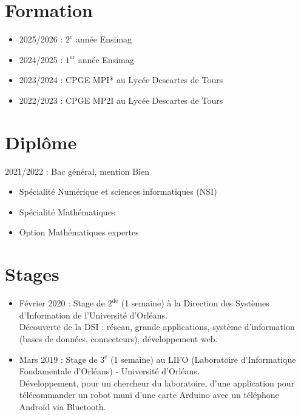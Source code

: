 \documentclass[11pt,oneside,a4paper,titlepage]{article}
\begin{document}
\begin{tcolorbox}
\begin{minipage}[t]{10.6cm}
\begin{tcolorbox}[grow to right by=0.75cm,colframe=white,colback=white]
      \section*{Formation}
      \begin{itemize}
        \item{2025/2026 : $2^e$ année Ensimag}
        \item{2024/2025 : $1^{\text{er}}$ année Ensimag}
        \item{2023/2024 : CPGE MPI* au Lycée Descartes de Tours}
        \item{2022/2023 : CPGE MP2I au Lycée Descartes de Tours}
      \end{itemize}

      \section*{Diplôme}
      2021/2022 : Bac général, mention Bien
      \begin{itemize}
        \item{Spécialité Numérique et sciences informatiques (NSI)}
        \item{Spécialité Mathématiques}
        \item{Option Mathématiques expertes}
      \end{itemize}

      \section*{Stages}
      \begin{itemize}
        \item{Février 2020 : Stage de $2^{\text{de}}$ (1 semaine) à la Direction des Systèmes d'Information de l'Université d'Orléans.\\Découverte de la DSI : réseau, grande applications, système d'information (bases de données, connecteurs), développement web.}
        \item{Mars 2019 : Stage de $3^{\text{e}}$ (1 semaine) au LIFO (Laboratoire d'Informatique Fondamentale d'Orléans) - Université d'Orléans.\\Développement, pour un chercheur du laboratoire, d'une application pour télécommander un robot muni d'une carte Arduino avec un téléphone Androïd via Bluetooth.}
      \end{itemize}
    \end{tcolorbox}
  \end{minipage}
\end{tcolorbox}
\end{document}

